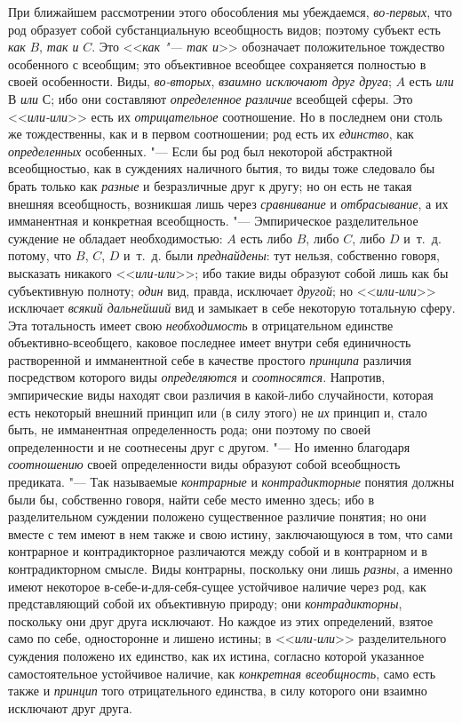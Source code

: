 При ближайшем рассмотрении этого обособления мы убеждаемся,
{\em во-первых}, что род
образует собой субстанциальную всеобщность видов; поэтому субъект есть
{\em как} $B$, {\em так и} $C$. Это <<{\em как "--- так и}>>
обозначает положительное тождество особенного с всеобщим; это
объективное всеобщее сохраняется полностью в своей особенности. Виды,
{\em во-вторых}, {\em взаимно исключают друг друга}; $A$ есть
{\em или} $В$ {\em или} $С$; ибо они составляют {\em определенное
различие} всеобщей сферы. Это <<{\em или-или}>> есть их {\em отрицательное}
соотношение. Но в последнем они столь же тождественны, как и
в первом соотношении; род есть их {\em единство}, как {\em определенных}
особенных. "--- Если бы род был некоторой
абстрактной всеобщностью, как в суждениях наличного бытия, то виды тоже
следовало бы брать только как {\em разные} и
безразличные друг к другу; но он есть не такая внешняя всеобщность,
возникшая лишь через {\em сравнивание} и {\em отбрасывание},
а их имманентная и конкретная всеобщность. "---
Эмпирическое разделительное суждение не обладает
необходимостью: $A$ есть либо $B$, либо $C$, либо $D$ и~т.~д.
потому, что $B$, $C$, $D$ и~т.~д. были {\em преднайдены}: тут
нельзя, собственно говоря, высказать никакого <<{\em или-или}>>; ибо
такие виды образуют собой лишь как бы субъективную полноту;
{\em один} вид, правда, исключает {\em другой}; но <<{\em или-или}>>
исключает {\em всякий дальнейший} вид и замыкает в себе некоторую
тотальную сферу. Эта тотальность имеет свою {\em необходимость} в
отрицательном единстве объективно-всеобщего, каковое последнее имеет внутри
себя единичность растворенной и имманентной себе в качестве простого
{\em принципа} различия посредством которого виды {\em определяются} и
{\em соотносятся}. Напротив, эмпирические виды находят свои различия в
какой-либо случайности, которая есть некоторый внешний принцип или (в силу
этого) не {\em их} принцип и, стало быть, не имманентная определенность рода;
они поэтому по своей определенности и не соотнесены друг с другом. "---
Но именно благодаря {\em соотношению} своей
определенности виды образуют собой всеобщность предиката. "--- Так называемые
{\em контрарные} и {\em контрадикторные}
понятия должны были бы, собственно говоря, найти себе место
именно здесь; ибо в разделительном суждении положено существенное различие
понятия; но они вместе с тем имеют в нем также и свою истину, заключающуюся
в том, что сами контрарное и контрадикторное различаются между собой и в
контрарном и в контрадикторном смысле. Виды контрарны, поскольку они лишь
{\em разны}, а именно
имеют некоторое в-себе-и-для-себя-сущее устойчивое наличие через род, как
представляющий собой их объективную природу; они {\em контрадикторны},
поскольку они друг друга исключают. Но каждое из этих
определений, взятое само по себе, односторонне и лишено истины; в
<<{\em или-или}>>
разделительного суждения положено их единство, как их истина,
согласно которой указанное самостоятельное устойчивое наличие, как
{\em конкретная всеобщность}, само есть также и {\em принцип} того
отрицательного единства, в силу которого они взаимно исключают друг друга.

